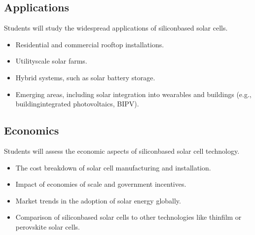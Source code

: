 \documentclass[letterpaper,10pt,english]{jupyterBook}
\begin{document}
\subsection{Applications}
\label{\detokenize{ProjectInstructions:applications}}
\sphinxAtStartPar
Students will study the widespread applications of silicon\sphinxhyphen{}based solar
cells.
\begin{itemize}
\item {} 
\sphinxAtStartPar
Residential and commercial rooftop installations.

\item {} 
\sphinxAtStartPar
Utility\sphinxhyphen{}scale solar farms.

\item {} 
\sphinxAtStartPar
Hybrid systems, such as solar battery storage.

\item {} 
\sphinxAtStartPar
Emerging areas, including solar integration into wearables and
buildings (e.g., building\sphinxhyphen{}integrated photovoltaics, BIPV).

\end{itemize}


\subsection{Economics}
\label{\detokenize{ProjectInstructions:economics}}
\sphinxAtStartPar
Students will assess the economic aspects of silicon\sphinxhyphen{}based solar cell
technology.
\begin{itemize}
\item {} 
\sphinxAtStartPar
The cost breakdown of solar cell manufacturing and installation.

\item {} 
\sphinxAtStartPar
Impact of economies of scale and government incentives.

\item {} 
\sphinxAtStartPar
Market trends in the adoption of solar energy globally.

\item {} 
\sphinxAtStartPar
Comparison of silicon\sphinxhyphen{}based solar cells to other technologies like
thin\sphinxhyphen{}film or perovskite solar cells.

\end{itemize}
\end{document}
